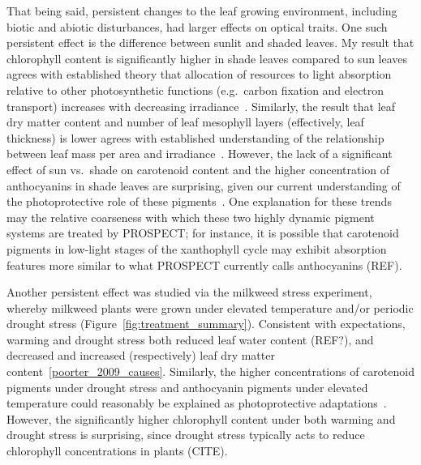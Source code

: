 That being said, persistent changes to the leaf growing environment, including biotic and abiotic disturbances, had larger effects on optical traits.
% 
% 
One such persistent effect is the difference between sunlit and shaded leaves.
My result that chlorophyll content is significantly higher in shade leaves compared to sun leaves agrees with established theory that allocation of resources to light absorption relative to other photosynthetic functions (e.g.\ carbon fixation and electron transport) increases with decreasing irradiance~\cite{hikosaka_1995_model}.
Similarly, the result that leaf dry matter content and number of leaf mesophyll layers (effectively, leaf thickness) is lower agrees with established understanding of the relationship between leaf mass per area and irradiance~\cite{poorter_2009_causes}.
However, the lack of a significant effect of sun vs.\ shade on carotenoid content and the higher concentration of anthocyanins in shade leaves are surprising, given our current understanding of the photoprotective role of these pigments~\cite{young_1991_photoprotective,steyn_2002_anthocyanins}.
One explanation for these trends may the relative coarseness with which these two highly dynamic pigment systems are treated by PROSPECT\@;
for instance, it is possible that carotenoid pigments in low-light stages of the xanthophyll cycle may exhibit absorption features more similar to what PROSPECT currently calls anthocyanins (REF). %

Another persistent effect was studied via the milkweed stress experiment, whereby milkweed plants were grown under elevated temperature and/or periodic drought stress (Figure~\ref{fig:treatment_summary}).
Consistent with expectations, warming and drought stress both reduced leaf water content (REF?), and decreased and increased (respectively) leaf dry matter content~\ref{poorter_2009_causes}.
Similarly, the higher concentrations of carotenoid pigments under drought stress and anthocyanin pigments under elevated temperature could reasonably be explained as photoprotective adaptations~\cite{young_1991_photoprotective,steyn_2002_anthocyanins}.
However, the significantly higher chlorophyll content under both warming and drought stress is surprising, since drought stress typically acts to reduce chlorophyll concentrations in plants (CITE).

